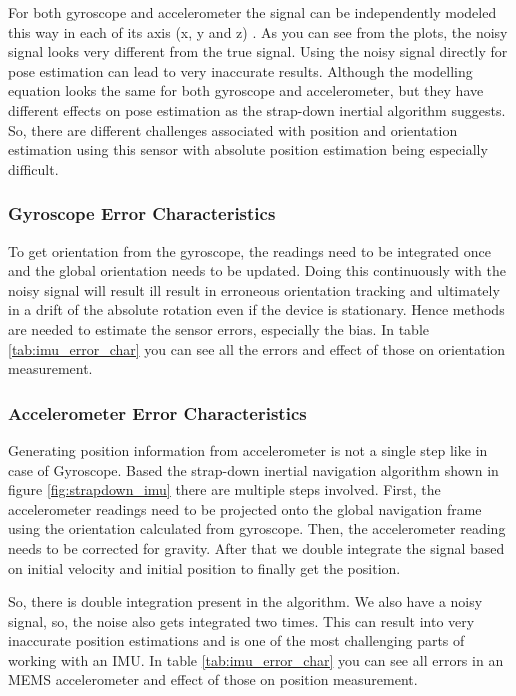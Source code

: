 For both gyroscope and accelerometer the signal can be independently modeled this way in each of its axis (x, y and z) \citep{imu_noise}. As you can see from the plots, the noisy signal looks very different from the true signal. Using the noisy signal directly for pose estimation can lead to very inaccurate results. Although the modelling equation looks the same for both gyroscope and accelerometer, but they have different effects on pose estimation as the strap-down inertial algorithm suggests. So, there are different challenges associated with position and orientation estimation using this sensor with absolute position estimation being especially difficult.

\subsubsection{Gyroscope Error Characteristics}
To get orientation from the gyroscope, the readings need to be integrated once and the global orientation needs to be updated. Doing this continuously with the noisy signal will result ill result in erroneous orientation tracking and ultimately in a drift of the absolute rotation even if the device is stationary. Hence methods are needed to estimate the sensor errors, especially the bias. In table \ref{tab:imu_error_char} you can see all the errors and effect of those on orientation measurement.

\subsubsection{Accelerometer Error Characteristics}
Generating position information from accelerometer is not a single step like in case of Gyroscope. Based the strap-down inertial navigation algorithm shown in figure \ref{fig:strapdown_imu} there are multiple steps involved. First, the accelerometer readings need to be projected onto the global navigation frame using the orientation calculated from gyroscope. Then, the accelerometer reading needs to be corrected for gravity. After that we double integrate the signal based on initial velocity and initial position to finally get the position.

So, there is double integration present in the algorithm. We also have a noisy signal, so, the noise also gets integrated two times. This can result into very inaccurate position estimations and is one of the most challenging parts of working with an IMU. In table \ref{tab:imu_error_char} you can see all errors in an MEMS accelerometer and effect of those on position measurement.

